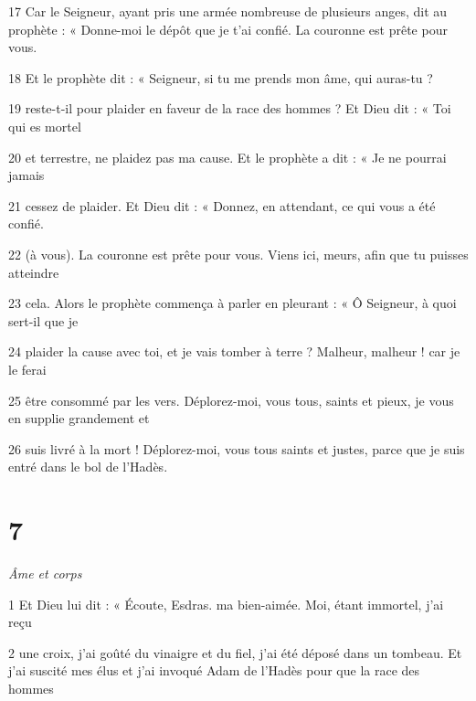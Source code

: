 \par 17 Car le Seigneur, ayant pris une armée nombreuse de plusieurs anges, dit au prophète : « Donne-moi le dépôt que je t'ai confié. La couronne est prête pour vous.

\par 18 Et le prophète dit : « Seigneur, si tu me prends mon âme, qui auras-tu ?

\par 19 reste-t-il pour plaider en faveur de la race des hommes ? Et Dieu dit : « Toi qui es mortel

\par 20 et terrestre, ne plaidez pas ma cause. Et le prophète a dit : « Je ne pourrai jamais

\par 21 cessez de plaider. Et Dieu dit : « Donnez, en attendant, ce qui vous a été confié.

\par 22 (à vous). La couronne est prête pour vous. Viens ici, meurs, afin que tu puisses atteindre

\par 23 cela. Alors le prophète commença à parler en pleurant : « Ô Seigneur, à quoi sert-il que je

\par 24 plaider la cause avec toi, et je vais tomber à terre ? Malheur, malheur ! car je le ferai

\par 25 être consommé par les vers. Déplorez-moi, vous tous, saints et pieux, je vous en supplie grandement et

\par 26 suis livré à la mort ! Déplorez-moi, vous tous saints et justes, parce que je suis entré dans le bol de l'Hadès.

\chapter{7}

\par \textit{Âme et corps}

\par 1 Et Dieu lui dit : « Écoute, Esdras. ma bien-aimée. Moi, étant immortel, j'ai reçu

\par 2 une croix, j'ai goûté du vinaigre et du fiel, j'ai été déposé dans un tombeau. Et j'ai suscité mes élus et j'ai invoqué Adam de l'Hadès pour que la race des hommes

